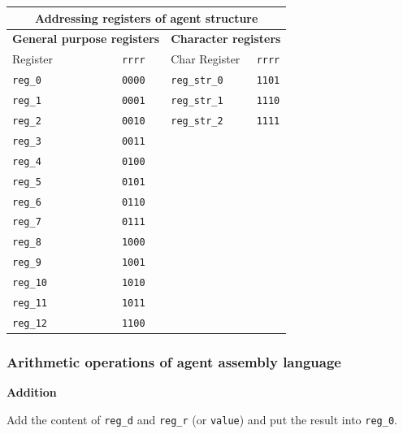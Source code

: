 \documentclass{scrreprt}
\begin{document}
\begin{tabular}{|l|c|l|c|}
\hline
\multicolumn{4}{|c|}{\textbf{Addressing registers of agent structure}}\\
\hline
\multicolumn{2}{|c|}{\textbf{General purpose registers}} & \multicolumn{2}{c|}{\textbf{Character registers}}\\
\hline
Register & \texttt{rrrr} & Char Register & \texttt{rrrr}\\
\hline
\texttt{reg_0} & \texttt{0000} & \texttt{reg_str_0} & \texttt{1101}\\
\hline
\texttt{reg_1} & \texttt{0001} & \texttt{reg_str_1} & \texttt{1110}\\
\hline
\texttt{reg_2} & \texttt{0010} & \texttt{reg_str_2} & \texttt{1111}\\
\hline
\texttt{reg_3} & \texttt{0011} &   &  \\
\hline
\texttt{reg_4} & \texttt{0100} &   &  \\
\hline
\texttt{reg_5} & \texttt{0101} &   &  \\
\hline
\texttt{reg_6} & \texttt{0110} &   &  \\
\hline
\texttt{reg_7} & \texttt{0111} &   &  \\
\hline
\texttt{reg_8} & \texttt{1000} &   &  \\
\hline
\texttt{reg_9} & \texttt{1001} &   &  \\
\hline
\texttt{reg_10} & \texttt{1010} &   &  \\
\hline
\texttt{reg_11} & \texttt{1011} &   &  \\
\hline
\texttt{reg_12} & \texttt{1100} &   &  \\
\hline

\end{tabular}

\subsubsection{Arithmetic operations of agent assembly language}
\noindent
\textbf{Addition}

\noindent
Add the content of \texttt{reg_d} and \texttt{reg_r} (or \texttt{value}) and put the result into \texttt{reg_0}.\\
\noindent
{}
\end{document}
